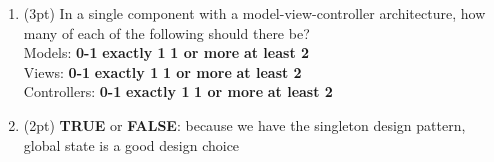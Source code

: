 \documentclass{report}
\newif\ifkey
\newcommand{\correct}[1]{\ifkey\color{red}\textbf{#1}\color{black}\else\textbf{#1}\fi\xspace}
\newcommand{\answershort}[1]{\ifkey\color{red}\underline{\textbf{#1}}\color{black}\else\underline{\hspace{3in}}\fi\xspace}
\newcommand*{\pts}[1]{\addtocounter{points}{#1}(#1pt)}
\begin{document}
\begin{spacing}{1.4}
\begin{enumerate}[leftmargin=*]
     \newpage
   \item \pts{3} In a single component with a model-view-controller architecture, how many of each of the following should there be?
     \\ Models: \hspace{0.75in} \textbf{0-1} \hspace{0.5in} \correct{exactly 1} \hspace{0.5in} \textbf{1 or more} \hspace{0.5in} \textbf{at least 2}
     \\ Views: \hspace{0.82in} \textbf{0-1} \hspace{0.5in} \textbf{exactly 1} \hspace{0.5in} \correct{1 or more} \hspace{0.5in} \textbf{at least 2}
     \\ Controllers: \hspace{0.51in} \textbf{0-1} \hspace{0.5in} \textbf{exactly 1} \hspace{0.5in} \correct{1 or more} \hspace{0.5in} \textbf{at least 2}

   \item \pts{2} \textbf{TRUE} or \correct{FALSE}: because we have the singleton design pattern, global state is a good design choice





\end{enumerate}
\end{spacing}
\end{document}
